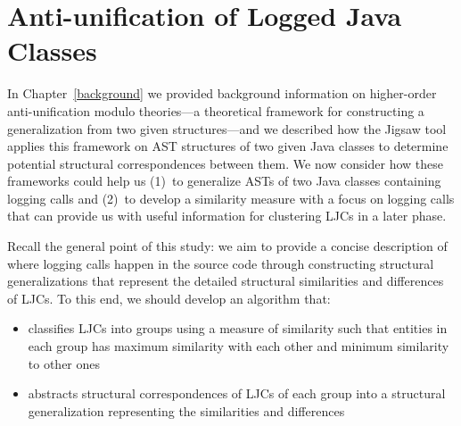 \chapter{Anti-unification of Logged Java Classes} \label{ch4} \label{methodology}
In Chapter~\ref{background} we provided background information on higher-order anti-unification modulo theories---a theoretical framework for constructing a generalization from two given structures---and we described how the Jigsaw tool applies this framework on AST structures of two given Java classes to determine potential structural correspondences between them. We now consider how these frameworks could help us (1)~to generalize ASTs of two Java classes containing logging calls and (2)~to develop a similarity measure with a focus on logging calls that can provide us with useful information for clustering LJCs in a later phase.

Recall the general point of this study: we aim to provide a concise description of where logging calls happen in the source code through constructing structural generalizations that represent the detailed structural similarities and differences of LJCs. To this end, we should develop an algorithm that:
\begin{itemize} [leftmargin=.3in]
\item classifies LJCs into groups using a measure of similarity such that entities in each group has maximum similarity with each other and minimum similarity to other ones
\item abstracts structural correspondences of LJCs of each group into a structural generalization representing the similarities and differences
\end{itemize}

